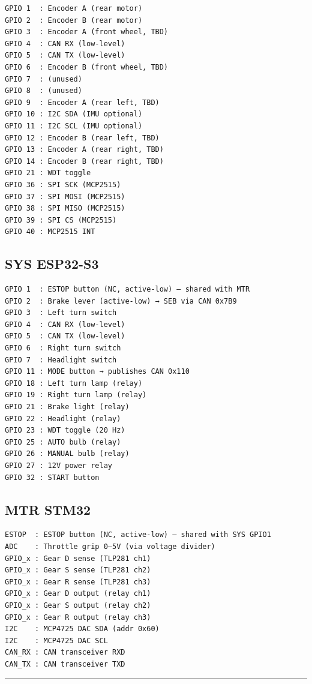 \documentclass[12pt,a4paper,oneside]{report}
\begin{document}
\begin{verbatim}
GPIO 1  : Encoder A (rear motor)
GPIO 2  : Encoder B (rear motor)
GPIO 3  : Encoder A (front wheel, TBD)
GPIO 4  : CAN RX (low-level)
GPIO 5  : CAN TX (low-level)
GPIO 6  : Encoder B (front wheel, TBD)
GPIO 7  : (unused)
GPIO 8  : (unused)
GPIO 9  : Encoder A (rear left, TBD)
GPIO 10 : I2C SDA (IMU optional)
GPIO 11 : I2C SCL (IMU optional)
GPIO 12 : Encoder B (rear left, TBD)
GPIO 13 : Encoder A (rear right, TBD)
GPIO 14 : Encoder B (rear right, TBD)
GPIO 21 : WDT toggle
GPIO 36 : SPI SCK (MCP2515)
GPIO 37 : SPI MOSI (MCP2515)
GPIO 38 : SPI MISO (MCP2515)
GPIO 39 : SPI CS (MCP2515)
GPIO 40 : MCP2515 INT
\end{verbatim}

\subsection{SYS ESP32-S3}\label{sys-esp32-s3}

\begin{verbatim}
GPIO 1  : ESTOP button (NC, active-low) — shared with MTR
GPIO 2  : Brake lever (active-low) → SEB via CAN 0x7B9
GPIO 3  : Left turn switch
GPIO 4  : CAN RX (low-level)
GPIO 5  : CAN TX (low-level)
GPIO 6  : Right turn switch
GPIO 7  : Headlight switch
GPIO 11 : MODE button → publishes CAN 0x110
GPIO 18 : Left turn lamp (relay)
GPIO 19 : Right turn lamp (relay)
GPIO 21 : Brake light (relay)
GPIO 22 : Headlight (relay)
GPIO 23 : WDT toggle (20 Hz)
GPIO 25 : AUTO bulb (relay)
GPIO 26 : MANUAL bulb (relay)
GPIO 27 : 12V power relay
GPIO 32 : START button
\end{verbatim}

\subsection{MTR STM32}\label{mtr-stm32}

\begin{verbatim}
ESTOP  : ESTOP button (NC, active-low) — shared with SYS GPIO1
ADC    : Throttle grip 0–5V (via voltage divider)
GPIO_x : Gear D sense (TLP281 ch1)
GPIO_x : Gear S sense (TLP281 ch2)
GPIO_x : Gear R sense (TLP281 ch3)
GPIO_x : Gear D output (relay ch1)
GPIO_x : Gear S output (relay ch2)
GPIO_x : Gear R output (relay ch3)
I2C    : MCP4725 DAC SDA (addr 0x60)
I2C    : MCP4725 DAC SCL
CAN_RX : CAN transceiver RXD
CAN_TX : CAN transceiver TXD
\end{verbatim}

\begin{center}\rule{0.5\linewidth}{0.5pt}\end{center}
\end{document}
